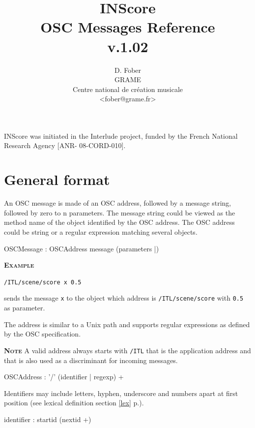 \documentclass[a4paper,twoside]{report}
\newcommand{\toplevel}[1]	{\chapter{#1}}
\newcommand{\fullref}[1]	{\ref{#1} p.\pageref{#1}}
\newcommand{\OSC}[1]		{\texttt{#1}}
\newcommand{\example}		{\textbf{\hspace{-1.5cm}\textbf{\textsc{Example }}}}
\newcommand{\note}	[1]		{\vspace{2mm}\textbf{\hspace{-1.03cm}\textbf{\textsc{Note #1}}}}
\newcommand{\sample}	[1]			{\vspace{-2mm}\begin{center}\colorbox{mygrey}{
								\begin{minipage}[t]{0.9\columnwidth} 
								{\small \texttt{#1}}
								\end{minipage}}\end{center}}
\begin{document}
\title{INScore \\ OSC Messages Reference \\v.1.02}

\author{D. Fober\\ GRAME\\ Centre national de cr\'eation musicale\\
{\small <fober@grame.fr>} \\
}

\maketitle

\vspace*{22cm}
{\small INScore was initiated in the Interlude project, funded by the French National Research Agency [ANR- 08-CORD-010].}
  

\pagestyle{empty}
\cleardoublepage
\tableofcontents
\newpage
\pagestyle{plain}
\setcounter{page}{1}

\toplevel{General format}
\label{genformat}
An OSC message is made of an OSC address, followed by a message string, followed by zero to n parameters. The message string could be viewed as the method name of the object identified by the OSC address.
The OSC address could be string or a regular expression matching several objects.
\begin{rail}
OSCMessage : OSCAddress message (parameters |)
\end{rail}
\example
\sample{/ITL/scene/score x 0.5}
sends the message \OSC{x} to the object which address is \OSC{/ITL/scene/score} with \OSC{0.5} as parameter.

The address is similar to a Unix path and supports regular expressions as defined by the OSC specification. 

\note{} A valid address always starts with \OSC{/ITL} that is the application address and that is also used as a discriminant for incoming messages.
\begin{rail}
OSCAddress : '/' (identifier | regexp) +
\end{rail}

Identifiers may include letters, hyphen, underscore and numbers apart at first position (see lexical definition section \fullref{lex}).
\railalias{nextid}{[-\_a-zA-Z0-9]]}
\begin{rail}
identifier : startid (nextid +)
\end{rail}
\end{document}
